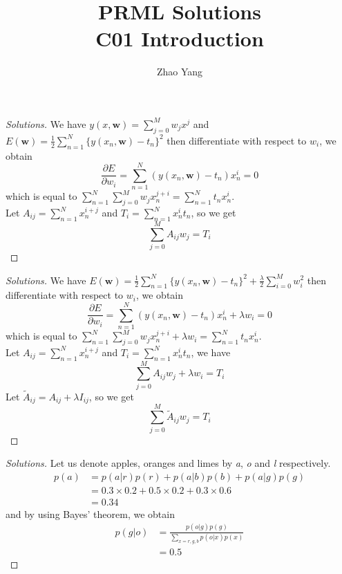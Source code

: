\documentclass[12pt]{article}
\title{PRML Solutions\\C01 Introduction}
\author{Zhao Yang}
\affil{Department of Automation, Tsinghua Unversity}
\date{}
\newenvironment{exercise}[2][Ex]{\begin{trivlist}
\item[\hskip \labelsep {\bfseries #1}\hskip \labelsep {\bfseries #2.}]}{\end{trivlist}}
\begin{document}
 
\maketitle
 
\begin{exercise}{1.1(*)} %
    \begin{proof}[Solutions]
        We have $y(x,\bm{w})=\sum_{j=0}^Mw_jx^j$ and $E(\bm{w})=\frac{1}{2}\sum_{n=1}
        ^N\{y(x_n,\bm{w})-t_n\}^2$ then differentiate with respect to $w_i$, we obtain
        \begin{equation}
            \frac{\partial E}{\partial w_i}=\sum_{n=1}^N(y(x_n,\bm{w})-t_n)x_n^i=0
        \end{equation}
        which is equal to $\sum_{n=1}^N\sum_{j=0}^Mw_jx_n^{j+i}=\sum_{n=1}^Nt_nx_n^i$.\\
        Let $A_{ij}=\sum_{n=1}^Nx_n^{i+j}$ and $T_i=\sum_{n=1}^Nx_n^it_n$, so we get
        \[
            \sum_{j=0}^MA_{ij}w_j=T_i
        \]
    \end{proof}
\end{exercise}
\begin{exercise}{1.2(*)}
    \begin{proof}[Solutions]
        We have $E(\bm{w})=\frac{1}{2}\sum_{n=1}^N\{y(x_n,\bm{w})-t_n\}^2+\frac{\lambda}{2}
        \sum_{i=0}^Mw_i^2$ then differentiate with respect to $w_i$, we obtain
        \begin{equation}
            \frac{\partial E}{\partial w_i}=\sum_{n=1}^N(y(x_n,\bm{w})-t_n)x_n^i+\lambda 
            w_i=0
        \end{equation}
        which is equal to $\sum_{n=1}^N\sum_{j=0}^Mw_jx_n^{j+i}+\lambda w_i=\sum_{n=1}^N
        t_nx_n^i$.\\
        Let $A_{ij}=\sum_{n=1}^Nx_n^{i+j}$ and $T_i=\sum_{n=1}^Nx_n^it_n$, we have
        \[
            \sum_{j=0}^MA_{ij}w_j+\lambda w_i=T_i 
            \]
        Let $\widetilde{A}_{ij}=A_{ij}+\lambda I_{ij}$, so we get
        \[
            \sum_{j=0}^M\widetilde{A}_{ij}w_j=T_i
            \]
    \end{proof}
\end{exercise}
\begin{exercise}{1.3(**)}
    \begin{proof}[Solutions]
        Let us denote apples, oranges and limes by \emph{a}, \emph{o} and \emph{l} respectively.
        \begin{align}
            p(a)&=p(a|r)p(r)+p(a|b)p(b)+p(a|g)p(g)\nonumber\\
            &=0.3\times 0.2+0.5\times 0.2+0.3\times 0.6\nonumber\\
            &=0.34
        \end{align}
        and by using Bayes' theorem, we obtain
        \begin{align}
            p(g|o)&=\frac{p(o|g)p(g)}{\sum_{x=r,g,b}p(o|x)p(x)}\nonumber\\
            &=0.5
        \end{align}
    \end{proof}
\end{exercise}
\end{document}
